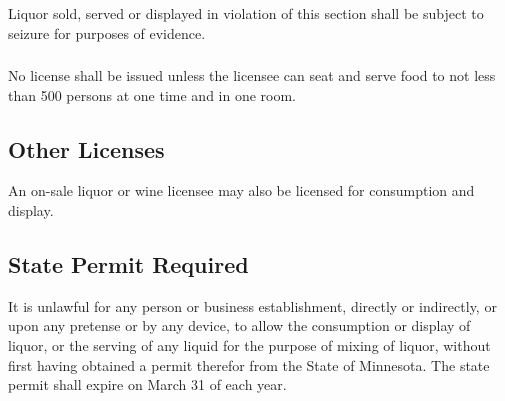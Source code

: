 \subsubsection{}
Liquor sold, served or displayed in violation of this section shall be subject to seizure for purposes of evidence.
\subsubsection{}
No license shall be issued unless the licensee can seat and serve food to not less than 500 persons at one time and in one room.
\subsection{Other Licenses}
An on-sale liquor or wine licensee may also be licensed for consumption and display.
\subsection{State Permit Required}
It is unlawful for any person or business establishment, directly or indirectly, or upon any pretense or by any device, to allow the consumption or display of liquor, or the serving of any liquid for the purpose of mixing of liquor, without first having obtained a permit therefor from the State of Minnesota.  The state permit shall expire on March 31 of each year.
